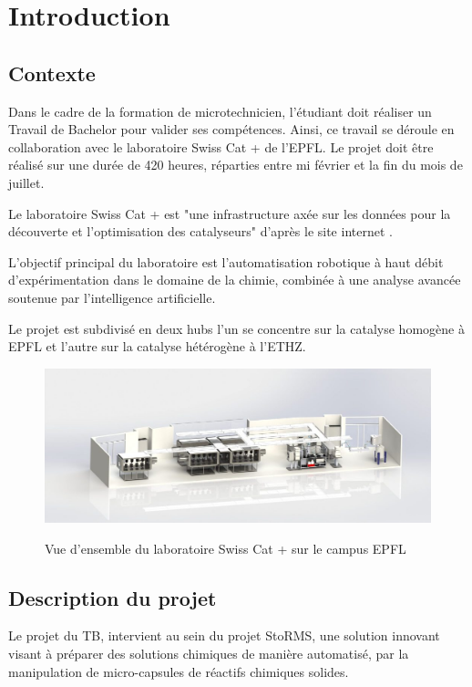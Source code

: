 \section{Introduction}

\subsection{Contexte}
Dans le cadre de la formation de microtechnicien, l'étudiant doit réaliser un Travail de Bachelor pour valider ses compétences. Ainsi, ce travail se déroule en collaboration avec le laboratoire Swiss Cat + de l'EPFL. Le projet doit être réalisé sur une durée de 420 heures, réparties entre mi février et la fin du mois de juillet.

\vspace{0.3cm}
Le laboratoire Swiss Cat + est "une infrastructure axée sur les données
pour la découverte et l'optimisation des catalyseurs" d'après le site internet \cite{swisscatweb}.

L'objectif principal du laboratoire est l'automatisation robotique à haut débit d'expérimentation dans le domaine de la chimie, combinée à une analyse avancée soutenue par l'intelligence artificielle.

\vspace{0.3cm}
Le projet est subdivisé en deux hubs l'un se concentre sur la catalyse homogène à EPFL et l'autre sur la catalyse hétérogène à l'ETHZ.

\begin{figure}[H]
    \centering
    \includegraphics[width=13cm]{Images/Illustrations/Intro/Labo_swisscat_vue3D.jpg}
    \label{fig:Labo-Vue-3D}
    \caption{Vue d'ensemble du laboratoire Swiss Cat + sur le campus EPFL}
\end{figure}

\subsection{Description du projet}
Le projet du TB, intervient au sein du projet StoRMS, une solution innovant visant à préparer des solutions chimiques de manière automatisé, par la manipulation de micro-capsules de réactifs chimiques solides. 

